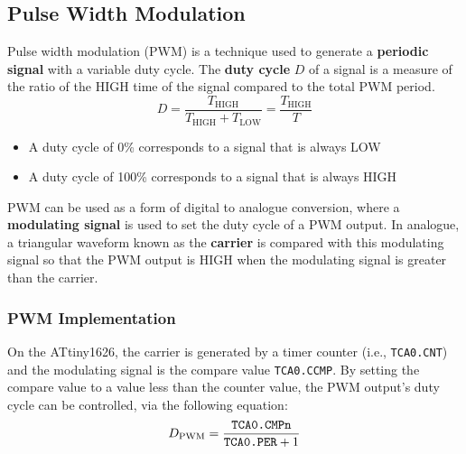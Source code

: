 \documentclass{article}
\begin{document}
\subsection{Pulse Width Modulation}
Pulse width modulation (PWM) is a technique used to generate a
\textbf{periodic signal} with a variable duty cycle. The \textbf{duty
cycle} \(D\) of a signal is a measure of the ratio of the HIGH time of
the signal compared to the total PWM period.
\begin{equation*}
    D = \frac{T_\mathrm{HIGH}}{T_\mathrm{HIGH} + T_\mathrm{LOW}} = \frac{T_\mathrm{HIGH}}{T}
\end{equation*}
\begin{itemize}
    \item A duty cycle of 0\% corresponds to a signal that is always
          LOW
    \item A duty cycle of 100\% corresponds to a signal that is always
          HIGH
\end{itemize}
PWM can be used as a form of digital to analogue conversion, where a
\textbf{modulating signal} is used to set the duty cycle of a PWM
output. In analogue, a triangular waveform known as the
\textbf{carrier} is compared with this modulating signal so that the
PWM output is HIGH when the modulating signal is greater than the
carrier.
\subsubsection{PWM Implementation}
On the ATtiny1626, the carrier is generated by a timer counter (i.e.,
\texttt{TCA0.CNT}) and the modulating signal is the compare
value \texttt{TCA0.CCMP}. By setting the compare value to a
value less than the counter value, the PWM output's duty cycle can be
controlled, via the following equation:
\begin{equation*}
    D_\mathrm{PWM} = \frac{\text{\texttt{TCA0.CMPn}}}{\text{\texttt{TCA0.PER}} + 1}
\end{equation*}
\end{document}
